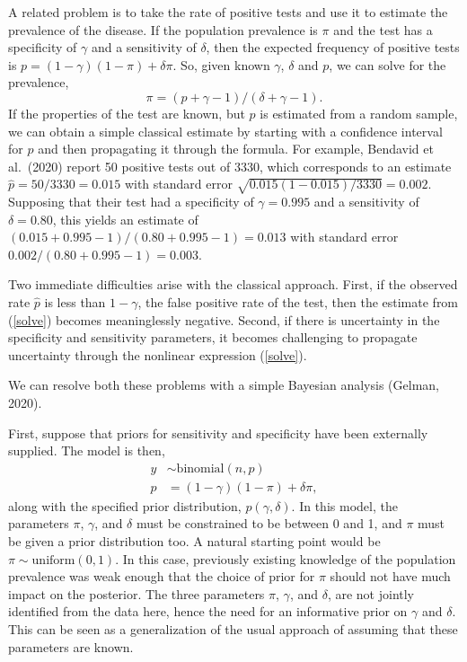 \documentclass[11pt]{article}
\begin{document}
A related problem is to take the rate of positive tests and use it to
estimate the prevalence of the disease.  If the population prevalence
is $\pi$ and the test has a specificity of $\gamma$ and a sensitivity
of $\delta$, then the expected frequency of positive tests is
$p=(1-\gamma)(1- \pi)+ \delta\pi$.  So, given known $\gamma$, $\delta$
and $p$, we can solve for the prevalence,
%
\begin{equation}\label{solve}
  \pi=(p + \gamma - 1)/(\delta + \gamma - 1).
\end{equation}
%
If the properties of the test are known, but $p$ is estimated from a
random sample, we can obtain a simple classical estimate by starting
with a confidence interval for $p$ and then propagating it through the
formula.  For example, Bendavid et al.\ (2020) report 50 positive
tests out of 3330, which corresponds to an estimate
$\hat{p}=50/3330=0.015$ with standard error
$\sqrt{0.015(1-0.015)/3330}=0.002$.  Supposing that their test had a
specificity of $\gamma=0.995$ and a sensitivity of $\delta=0.80$, this
yields an estimate of $(0.015 + 0.995 - 1)/(0.80 + 0.995 -1) = 0.013$
with standard error $0.002/(0.80 + 0.995 -1) = 0.003$.

Two immediate difficulties arise with the classical approach.  First,
if the observed rate $\hat{p}$ is less than $1-\gamma$, the false
positive rate of the test, then the estimate from (\ref{solve})
becomes meaninglessly negative.  Second, if there is uncertainty in
the specificity and sensitivity parameters, it becomes challenging to
propagate uncertainty through the nonlinear expression (\ref{solve}).

We can resolve both these problems with a simple Bayesian analysis
(Gelman, 2020).

First, suppose that priors for sensitivity and specificity have been
externally supplied.  The model is then, 
% 
\begin{align}
\nonumber  y & \sim \mbox{binomial} (n, p) \\
 p & = (1-\gamma)(1- \pi)+ \delta\pi , \label{normals} 
\end{align}
%
along with the specified prior distribution, $p(\gamma,\delta)$.  In
this model, the parameters $\pi$, $\gamma$, and $\delta$ must be
constrained to be between 0 and 1, and $\pi$ must be given a prior
distribution too.  A natural starting point would be
$\pi\sim \mbox{uniform}(0,1)$.  In this case, previously existing
knowledge of the population prevalence was weak enough that the choice
of prior for $\pi$ should not have much impact on the posterior.  The
three parameters $\pi$, $\gamma$, and $\delta$, are not jointly
identified from the data here, hence the need for an informative prior
on $\gamma$ and $\delta$. This can be seen as a generalization of the
usual approach of assuming that these parameters are known.
\end{document}
